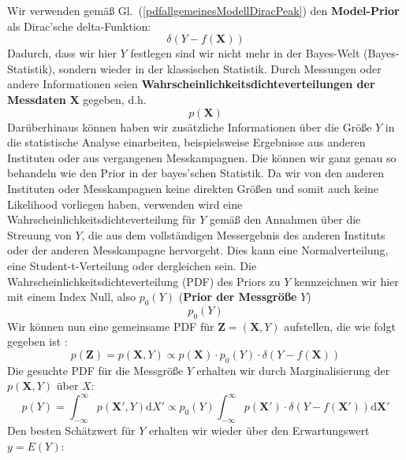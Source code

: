 Wir verwenden
gemäß Gl.~(\ref{pdfallgemeinesModellDiracPeak}) den \textbf{Model-Prior} als Dirac'sche delta-Funktion: 
\begin{equation}
\delta(Y-f(\boldsymbol{X}))
\end{equation}
Dadurch, dass wir hier $Y$ festlegen sind wir nicht mehr in der 
Bayes-Welt (Bayes-Statistik), sondern wieder in der klassischen 
Statistik. 
Durch Messungen oder andere Informationen seien 
\textbf{Wahrscheinlichkeitsdichteverteilungen der Messdaten} $\boldsymbol{X}$
gegeben, d.h.
\begin{equation}
p(\boldsymbol{X})
\end{equation}
Darüberhinaus können haben wir zusätzliche Informationen über die Größe
$Y$ in die statistische Analyse einarbeiten, beispielsweise Ergebnisse
aus anderen Instituten oder aus vergangenen Messkampagnen. 
Die können wir ganz genau so behandeln wie den Prior in der
bayes'schen Statistik. Da wir von den anderen Instituten oder Messkampagnen
keine direkten Größen und somit auch keine Likelihood vorliegen haben, verwenden
wird eine Wahrscheinlichkeitsdichteverteilung für $Y$ gemäß den Annahmen über
die Streuung von $Y$, die aus dem vollständigen Messergebnis des anderen Instituts oder
der anderen Messkampagne hervorgeht. Dies kann eine Normalverteilung, eine Student-t-Verteilung
oder dergleichen sein. Die Wahrscheinlichkeitsdichteverteilung (PDF) des
Priors zu $Y$ kennzeichnen wir hier mit einem Index 
\glqq Null\grqq, also $p_0(Y)$ (\textbf{Prior der Messgröße} $Y$) 
\begin{equation}
p_0(Y)
\end{equation}
Wir können nun eine gemeinsame PDF für $\boldsymbol{Z} = (\boldsymbol{X},Y)$
aufstellen, die wie folgt gegeben ist \cite{Els07}: 
\begin{equation}
p(\boldsymbol{Z}) = p(\boldsymbol{X},Y) \propto p(\boldsymbol{X}) \cdot p_0(Y) \cdot \delta(Y-f(\boldsymbol{X})) 
\end{equation}
Die gesuchte PDF für die Messgröße $Y$ erhalten wir durch Marginalisierung der $p(\boldsymbol{X},Y)$ über $X$:
\begin{equation}
p(Y) = \int_{-\infty}^{\infty} p(\boldsymbol{X'},Y) \mathrm{d} X'
\propto p_0(Y)\int_{-\infty}^{\infty}  p(\boldsymbol{X'}) \cdot \delta(Y-f(\boldsymbol{X'})) \mathrm{d} \boldsymbol{X'} 
\label{eq:pdf_Y_durch_Marginalisierung}
\end{equation}
Den besten Schätzwert für $Y$ erhalten wir wieder über den 
Erwartungswert $y=E(Y)$:
